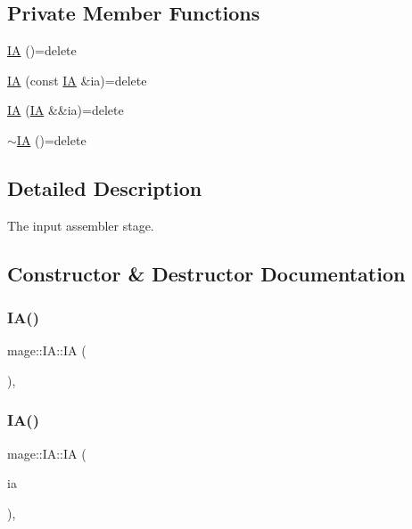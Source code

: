 \subsection*{Private Member Functions}
\begin{DoxyCompactItemize}
\item 
\hyperlink{structmage_1_1_i_a_aadeb33602ebb87f61576f839a0b69d33}{IA} ()=delete
\item 
\hyperlink{structmage_1_1_i_a_a50442d5b119695bd12be8a002a583b97}{IA} (const \hyperlink{structmage_1_1_i_a}{IA} \&ia)=delete
\item 
\hyperlink{structmage_1_1_i_a_a9e15a3e966e93659b7c0a55b91a10163}{IA} (\hyperlink{structmage_1_1_i_a}{IA} \&\&ia)=delete
\item 
\hyperlink{structmage_1_1_i_a_a8f5f2215cca9500c52af7e7c9ef0208e}{$\sim$\+IA} ()=delete
\end{DoxyCompactItemize}


\subsection{Detailed Description}
The input assembler stage. 

\subsection{Constructor \& Destructor Documentation}
\hypertarget{structmage_1_1_i_a_aadeb33602ebb87f61576f839a0b69d33}{}\label{structmage_1_1_i_a_aadeb33602ebb87f61576f839a0b69d33} 
\subsubsection{\texorpdfstring{I\+A()}{IA()}\hspace{0.1cm}{\footnotesize\ttfamily [1/3]}}
{\footnotesize\ttfamily mage\+::\+I\+A\+::\+IA (\begin{DoxyParamCaption}{ }\end{DoxyParamCaption})\hspace{0.3cm}{\ttfamily [private]}, {\ttfamily [delete]}}

\hypertarget{structmage_1_1_i_a_a50442d5b119695bd12be8a002a583b97}{}\label{structmage_1_1_i_a_a50442d5b119695bd12be8a002a583b97} 
\subsubsection{\texorpdfstring{I\+A()}{IA()}\hspace{0.1cm}{\footnotesize\ttfamily [2/3]}}
{\footnotesize\ttfamily mage\+::\+I\+A\+::\+IA (\begin{DoxyParamCaption}\item[{const \hyperlink{structmage_1_1_i_a}{IA} \&}]{ia }\end{DoxyParamCaption})\hspace{0.3cm}{\ttfamily [private]}, {\ttfamily [delete]}}

